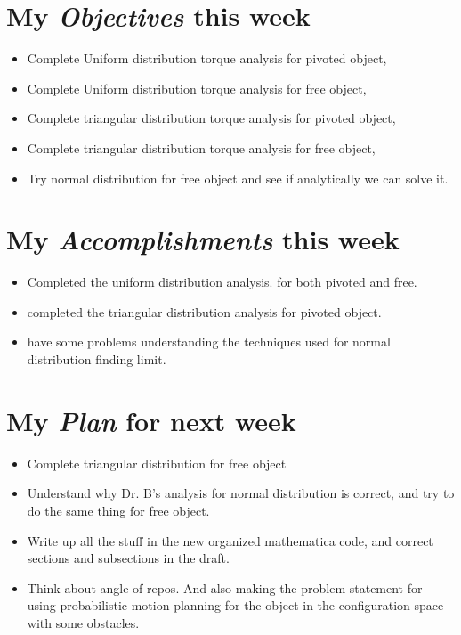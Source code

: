 \newcommand{\handoutName}{Weekly report}
\newcommand{\handoutdate}{\today}


\section{My \emph{Objectives} this week}
\begin{itemize}
\item Complete Uniform distribution torque analysis for pivoted object,
\item Complete Uniform distribution torque analysis for free object,
\item Complete triangular distribution torque analysis for pivoted object,
\item Complete triangular distribution torque analysis for free object,
\item Try normal distribution for free object and see if analytically we can solve it.
\end{itemize}



\section{My \emph{Accomplishments} this week}


\begin{itemize}
\item Completed the uniform distribution analysis. for both pivoted and free.
\item completed the triangular distribution analysis for pivoted object.
\item have some problems understanding the techniques used for normal distribution finding limit.
\end{itemize}


\section{My \emph{Plan} for next week}

\begin{itemize}
\item Complete triangular distribution for free object
\item Understand why Dr. B's analysis for normal distribution is correct, and try to do the same thing for free object.
\item Write up all the stuff in the new organized mathematica code, and correct sections and subsections in the draft.
\item Think about angle of repos. And also making the problem statement for using probabilistic motion planning for the object in the configuration space with some obstacles.
\end{itemize}

